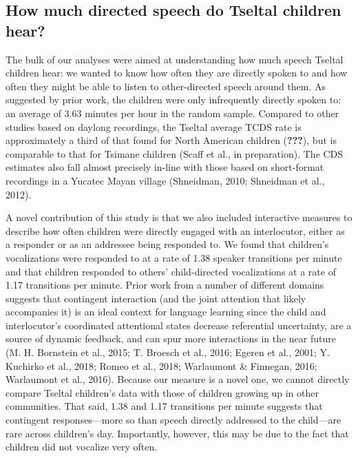 \documentclass[floatsintext,man]{apa6}
\theoremstyle{definition}
\theoremstyle{definition}
\theoremstyle{definition}
\theoremstyle{remark}
\begin{document}
\subsection{How much directed speech do Tseltal children
hear?}\label{how-much-directed-speech-do-tseltal-children-hear}

The bulk of our analyses were aimed at understanding how much speech
Tseltal children hear: we wanted to know how often they are directly
spoken to and how often they might be able to listen to other-directed
speech around them. As suggested by prior work, the children were only
infrequently directly spoken to: an average of 3.63 minutes per hour in
the random sample. Compared to other studies based on daylong
recordings, the Tseltal average TCDS rate is approximately a third of
that found for North American children ({\textbf{???}}), but is
comparable to that for Tsimane children (Scaff et al., in preparation).
The CDS estimates also fall almost precisely in-line with those based on
short-format recordings in a Yucatec Mayan village (Shneidman, 2010;
Shneidman et al., 2012).

A novel contribution of this study is that we also included interactive
measures to describe how often children were directly engaged with an
interlocutor, either as a responder or as an addressee being responded
to. We found that children's vocalizations were responded to at a rate
of 1.38 speaker transitions per minute and that children responded to
others' child-directed vocalizations at a rate of 1.17 transitions per
minute. Prior work from a number of different domains suggests that
contingent interaction (and the joint attention that likely accompanies
it) is an ideal context for language learning since the child and
interlocutor's coordinated attentional states decrease referential
uncertainty, are a source of dynamic feedback, and can spur more
interactions in the near future (M. H. Bornstein et al., 2015; T.
Broesch et al., 2016; Egeren et al., 2001; Y. Kuchirko et al., 2018;
Romeo et al., 2018; Warlaumont \& Finnegan, 2016; Warlaumont et al.,
2016). Because our measure is a novel one, we cannot directly compare
Tseltal children's data with those of children growing up in other
communities. That said, 1.38 and 1.17 transitions per minute suggests
that contingent responses---more so than speech directly addressed to
the child---are rare across children's day. Importantly, however, this
may be due to the fact that children did not vocalize very often.
\end{document}
